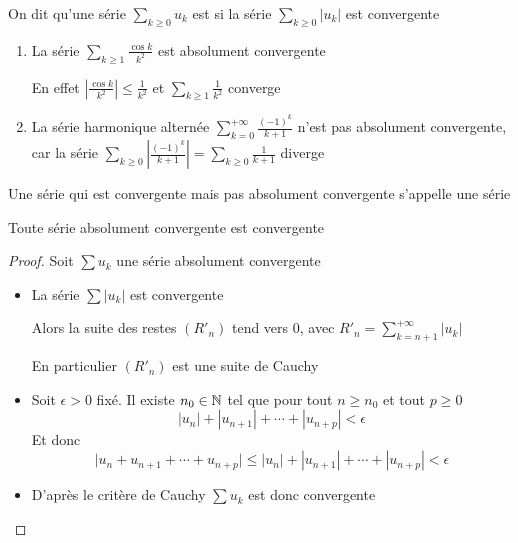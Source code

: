 \begin{frame}

\begin{mydefinition}
On dit qu'une série $\displaystyle\sum_{k\ge0} u_k$ est 
 si la série $\displaystyle\sum_{k\ge0} |u_k|$ 
est convergente  
\end{mydefinition}

\pause
\begin{exemple}
\begin{enumerate}
  \item La série $\sum_{k\ge1} \frac{\cos k}{k^2}$ est absolument convergente
  
  \pause
  En effet $\left\vert\frac{\cos k}{k^2}\right\vert \le  \frac{1}{k^2}$ et
  $\sum_{k\ge1} \frac{1}{k^2}$ converge
  
  \item\pause La série harmonique alternée $\sum_{k=0}^{+\infty} \frac{(-1)^k}{k+1}$ 
  n'est pas absolument convergente\pause , car la série $\sum_{k\ge0} \left\vert\frac{(-1)^k}{k+1}\right\vert = \sum_{k\ge0} \frac{1}{k+1}$ diverge
\end{enumerate}
\end{exemple}

\pause
Une série qui est convergente mais pas absolument convergente s'appelle une série 
\end{frame}


\begin{frame}

\begin{theoreme}
Toute série absolument convergente est convergente
\end{theoreme}

\pause
\begin{proof}
Soit $\sum u_k$ une série absolument convergente
\begin{itemize}
\item\pause La série $\sum |u_k|$ est convergente

\pause
Alors la suite des restes $(R'_n)$ tend vers $0$, avec $R'_n = \displaystyle\sum_{k=n+1}^{+\infty} |u_k|$

\pause
En particulier $(R'_n)$ est une suite de Cauchy

\item\pause Soit $\epsilon>0$ fixé. \pause Il existe $n_0 \in \mathbb{N}$ tel que 
pour tout $n \ge n_0$ et tout $p \ge 0$ 
$$|u_n|+|u_{n+1}|+\cdots+|u_{n+p}| < \epsilon$$
\pause
Et donc
$$\big|u_n+u_{n+1}+\cdots+u_{n+p}\big| \le |u_n|+|u_{n+1}|+\cdots+|u_{n+p}| < \epsilon$$

\item\pause D'après le critère de Cauchy $\sum u_k$ est donc convergente
\qedhere
\end{itemize}
\end{proof}
\end{frame}



